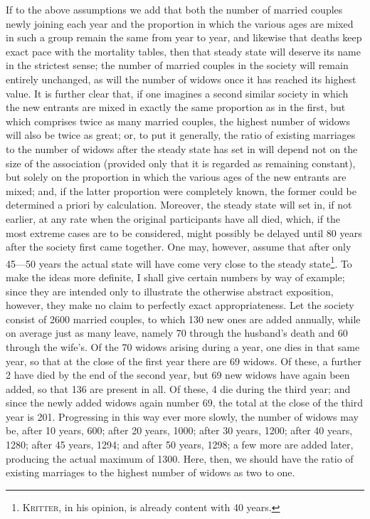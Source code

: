 If to the above assumptions we add that both the number of married couples
newly joining each year and the proportion in which the various ages are mixed in such a group remain the same from year to year, and likewise that deaths keep exact pace with the mortality tables, then that steady state will deserve its name in the strictest sense; the number of married couples in the society will remain entirely unchanged, as will the number of widows once it has reached its highest value. It is further clear that, if one imagines a second similar society in which the new entrants are mixed in exactly the same proportion as in the first, but which comprises twice as many married couples, the highest number of widows will also be twice as great; or, to put it generally, the ratio of existing marriages to the number of widows after the steady state has set in will depend not on the size of the association (provided only that it is regarded as remaining constant), but solely on the proportion in which the various ages of the new entrants are mixed; and, if the latter proportion were completely known, the former could be determined a priori by calculation. Moreover, the steady state will set in, if not earlier, at any rate when the original participants have all died, which, if the most extreme cases are to be considered, might possibly be delayed until 80 years after the society first came together. One may, however, assume that after only 45—50 years the actual state will have come very close to the steady state\footnote{\textsc{Kritter}, in his opinion, is already content with 40 years.}. To make the ideas more definite, I shall give certain numbers by way of example; since they are intended only to illustrate the otherwise abstract exposition, however, they make no claim to perfectly exact appropriateness. Let the society consist of 2600 married couples, to which 130 new ones are added annually, while on average just as many leave, namely 70 through the husband's death and 60 through the wife's. Of the 70 widows arising during a year, one dies in that same year, so that at the close of the first year there are 69 widows. Of these, a further 2 have died by the end of the second year, but 69 new widows have again been added, so that 136 are present in all. Of these, 4 die during the third year; and since the newly added widows again number 69, the total at the close of the third year is 201. Progressing in this way ever more slowly, the number of widows may be, after 10 years, 600; after 20 years, 1000; after 30 years, 1200; after 40 years, 1280; after 45 years, 1294; and after 50 years, 1298; a few more are added later, producing the actual maximum of 1300. Here, then, we should have the ratio of existing marriages to the highest number of widows as two to one.

